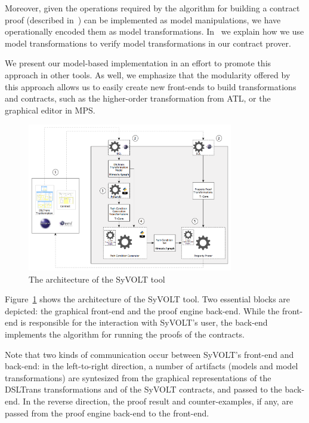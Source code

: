 Moreover, given the operations required by the algorithm for building a contract
proof (described in~\cite{Lucio2014}) can be implemented as model manipulations,
we have operationally encoded them as model transformations.
In~\cite{LucioVang} we explain how we use model transformations to
verify model transformations in our contract prover.

We present our model-based implementation in an effort to promote this approach in other tools. As well, we emphasize that the modularity offered by this approach allows us to easily create new front-ends to build transformations and contracts, such as the higher-order transformation from ATL, or the graphical editor in MPS.

\begin{figure}
\centering
\includegraphics[width=0.8\textwidth]{figures/syvolt_prover/tooling_arch}
\caption{The architecture of the SyVOLT tool}
\label{fig:arch}
\end{figure}


Figure~\ref{fig:arch} shows the
architecture of the SyVOLT tool. Two essential blocks are depicted: the
graphical front-end and the proof engine back-end. While the front-end
is responsible for the interaction with SyVOLT's user, the back-end implements
the algorithm for running the proofs of the contracts.

Note that two kinds of
communication occur between SyVOLT's front-end and back-end: in the
left-to-right direction, a number of artifacts (models and model
transformations) are syntesized from the graphical representations of the
DSLTrans transformations and of the SyVOLT contracts, and passed to the
back-end. In the reverse direction, the proof result and counter-examples, if
any, are passed from the proof engine back-end to the front-end.


